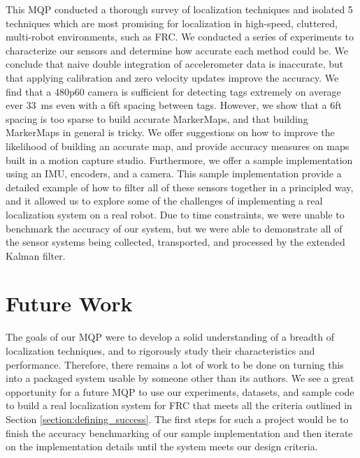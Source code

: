 \documentclass{article}
\begin{document}
  This MQP conducted a thorough survey of localization techniques and isolated 5 techniques which are most promising for localization in high-speed, cluttered, multi-robot environments, such as FRC. We conducted a series of experiments to characterize our sensors and determine how accurate each method could be. We conclude that naive double integration of accelerometer data is inaccurate, but that applying calibration and zero velocity updates improve the accuracy. We find that a 480p60 camera is sufficient for detecting tags extremely on average ever \SI{33}{\milli\second} even with a 6ft spacing between tags. However, we show that a 6ft spacing is too sparse to build accurate MarkerMaps, and that building MarkerMaps in general is tricky. We offer suggestions on how to improve the likelihood of building an accurate map, and provide accuracy measures on maps built in a motion capture studio. Furthermore, we offer a sample implementation using an IMU, encoders, and a camera. This sample implementation provide a detailed example of how to filter all of these sensors together in a principled way, and it allowed us to explore some of the challenges of implementing a real localization system on a real robot. Due to time constraints, we were unable to benchmark the accuracy of our system, but we were able to demonstrate all of the sensor systems being collected, transported, and processed by the extended Kalman filter.



\section{Future Work} \label{section:future_work}

  The goals of our MQP were to develop a solid understanding of a breadth of localization techniques, and to rigorously study their characteristics and performance. Therefore, there remains a lot of work to be done on turning this into a packaged system usable by someone other than its authors. We see a great opportunity for a future MQP to use our experiments, datasets, and sample code to build a real localization system for FRC that meets all the criteria outlined in Section \ref{section:defining_success}. The first steps for such a project would be to finish the accuracy benchmarking of our sample implementation and then iterate on the implementation details until the system meets our design criteria.
\end{document}
